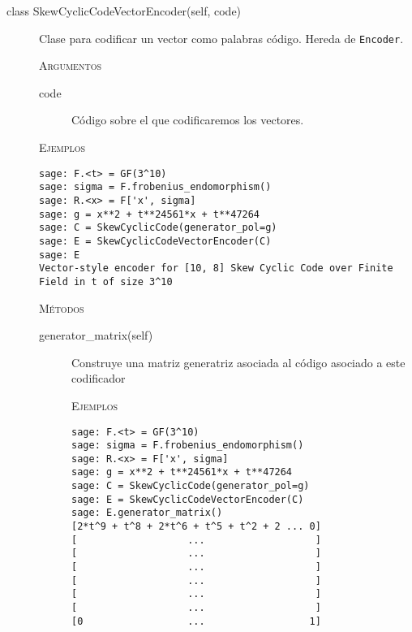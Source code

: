 \begin{description}
    \item[class SkewCyclicCodeVectorEncoder(self, code)]
    Clase para codificar un vector como palabras código. Hereda de \texttt{Encoder}.

    \textsc{Argumentos}

    \begin{description}
        \item[code]
        Código sobre el que codificaremos los vectores.

    \end{description}

    \textsc{Ejemplos}

    \begin{lstlisting}
sage: F.<t> = GF(3^10)
sage: sigma = F.frobenius_endomorphism()
sage: R.<x> = F['x', sigma]
sage: g = x**2 + t**24561*x + t**47264
sage: C = SkewCyclicCode(generator_pol=g)
sage: E = SkewCyclicCodeVectorEncoder(C)
sage: E
Vector-style encoder for [10, 8] Skew Cyclic Code over Finite Field in t of size 3^10
    \end{lstlisting}

    \textsc{Métodos}

    \begin{description}
        \item[generator\_matrix(self)]
        Construye una matriz generatriz asociada al código asociado a este codificador

        \textsc{Ejemplos}
    \begin{lstlisting}
sage: F.<t> = GF(3^10)
sage: sigma = F.frobenius_endomorphism()
sage: R.<x> = F['x', sigma]
sage: g = x**2 + t**24561*x + t**47264
sage: C = SkewCyclicCode(generator_pol=g)
sage: E = SkewCyclicCodeVectorEncoder(C)
sage: E.generator_matrix()
[2*t^9 + t^8 + 2*t^6 + t^5 + t^2 + 2 ... 0]
[                   ...                   ]
[                   ...                   ]
[                   ...                   ]
[                   ...                   ]
[                   ...                   ]
[                   ...                   ]
[0                  ...                  1]
    \end{lstlisting}
    \end{description}

\end{description}

